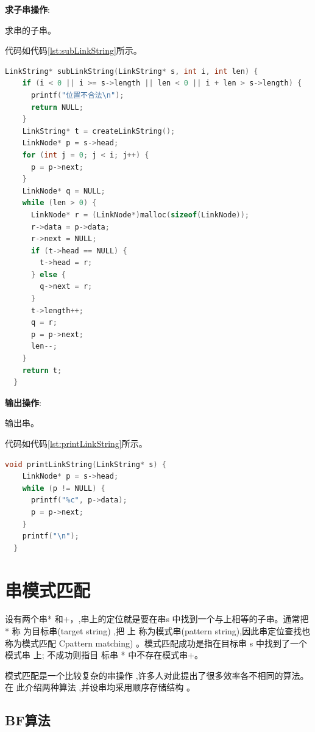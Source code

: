 \documentclass[lang=cn,newtx,10pt,scheme=chinese]{elegantbook}
\begin{document}
\textbf{求子串操作}:

求串的子串。

代码如代码\ref{lst:subLinkString}所示。

\begin{lstlisting}[language=C++, caption={求串的子串示例代码}, label={lst:subLinkString}]
  LinkString* subLinkString(LinkString* s, int i, int len) {
    if (i < 0 || i >= s->length || len < 0 || i + len > s->length) {
      printf("位置不合法\n");
      return NULL;
    }
    LinkString* t = createLinkString();
    LinkNode* p = s->head;
    for (int j = 0; j < i; j++) {
      p = p->next;
    }
    LinkNode* q = NULL;
    while (len > 0) {
      LinkNode* r = (LinkNode*)malloc(sizeof(LinkNode));
      r->data = p->data;
      r->next = NULL;
      if (t->head == NULL) {
        t->head = r;
      } else {
        q->next = r;
      }
      t->length++;
      q = r;
      p = p->next;
      len--;
    }
    return t;
  }

\end{lstlisting}

\textbf{输出操作}:

输出串。

代码如代码\ref{lst:printLinkString}所示。

\begin{lstlisting}[language=C++, caption={输出串示例代码}, label={lst:printLinkString}]
  void printLinkString(LinkString* s) {
    LinkNode* p = s->head;
    while (p != NULL) {
      printf("%c", p->data);
      p = p->next;
    }
    printf("\n");
  }

\end{lstlisting}


\section{串模式匹配}

设有两个串* 和+，,串上的定位就是要在串s 中找到一个与上相等的子串。通常把 * 称
为目标串(target string) ,把 上 称为模式串(pattern string),因此串定位查找也称为模式匹配
Cpattern matching) 。模式匹配成功是指在目标串 s 中找到了一个模式串 上; 不成功则指目
标串 * 中不存在模式串+。

模式匹配是一个比较复杂的串操作 ,许多人对此提出了很多效率各不相同的算法。在
此介绍两种算法 ,并设串均采用顺序存储结构 。

\subsection{BF算法}
\end{document}
